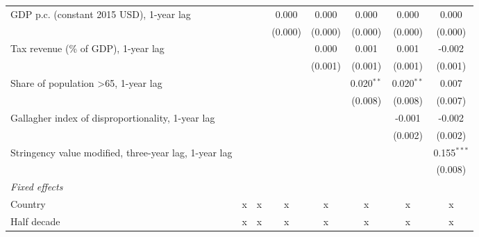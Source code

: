 \begin{table}[htbp]
\begin{tabular}{lccccccc}
      GDP p.c. (constant 2015 USD), 1-year lag                        &                &                & 0.000         & 0.000         & 0.000         & 0.000         & 0.000\\   
                                                                      &                &                & (0.000)       & (0.000)       & (0.000)       & (0.000)       & (0.000)\\   
      Tax revenue (\% of GDP), 1-year lag                             &                &                &               & 0.000         & 0.001         & 0.001         & -0.002\\   
                                                                      &                &                &               & (0.001)       & (0.001)       & (0.001)       & (0.001)\\   
      Share of population >65, 1-year lag                             &                &                &               &               & 0.020$^{**}$  & 0.020$^{**}$  & 0.007\\   
                                                                      &                &                &               &               & (0.008)       & (0.008)       & (0.007)\\   
      Gallagher index of disproportionality, 1-year lag               &                &                &               &               &               & -0.001        & -0.002\\   
                                                                      &                &                &               &               &               & (0.002)       & (0.002)\\   
      Stringency value modified, three-year lag, 1-year lag           &                &                &               &               &               &               & 0.155$^{***}$\\   
                                                                      &                &                &               &               &               &               & (0.008)\\   
      \emph{Fixed effects}\\
      Country                                                         & x              & x              & x             & x             & x             & x             & x\\  
      Half decade                                                     & x              & x              & x             & x             & x             & x             & x\\  

\end{tabular}
\end{table}
